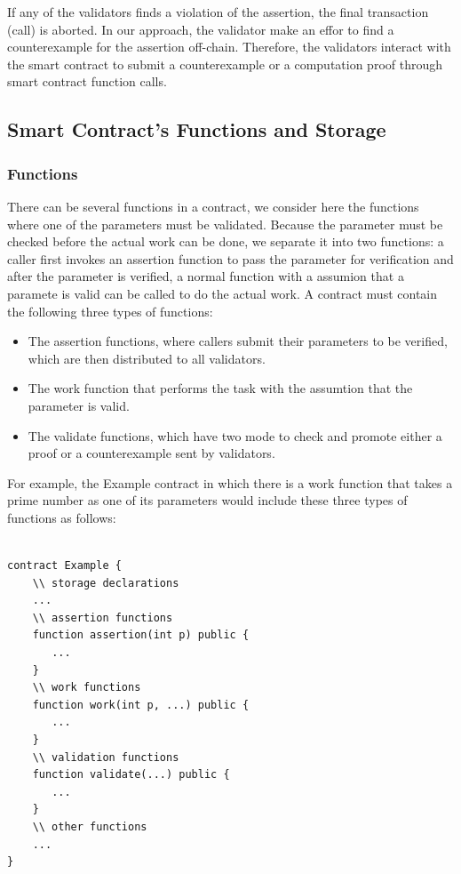 \documentclass[runningheads]{llncs}
\begin{document}
If any of the validators finds a violation of the assertion, the final transaction (call) is aborted. In our approach, the validator make an effor to find a counterexample for the assertion off-chain. Therefore, the validators interact with the smart contract to submit a  counterexample or a computation proof through smart contract function calls. 
\subsection{Smart Contract's Functions and Storage}
\subsubsection{Functions}
There can be several functions in a contract, we consider here the functions where one of the parameters must be validated. Because the parameter must be checked before the actual work can be done, we separate it into two functions: a caller first invokes an assertion function to pass the parameter for  verification and after the parameter is verified, a normal function with a assumion that a paramete is valid can be called to do the actual work.  A contract must contain the following three types of functions:  

\begin{itemize}
\item The assertion functions, where callers submit their parameters to be verified, which are then distributed to all validators. 
\item  The work function that performs the task with the assumtion that the parameter is valid. 
\item The validate functions, which have two mode to check and promote either a proof or a counterexample sent by validators.
\end{itemize}

For example, the Example contract in which there is a work function that  takes a prime number as one of its parameters would include these three types of functions  as follows:

\begin{lstlisting}[numbers=none]

contract Example {
    \\ storage declarations
    ...
    \\ assertion functions
    function assertion(int p) public {
       ...
    } 
    \\ work functions
    function work(int p, ...) public {
       ...
    }
    \\ validation functions   
    function validate(...) public {
       ...
    }
    \\ other functions
    ...
}
\end{lstlisting}
\end{document}
